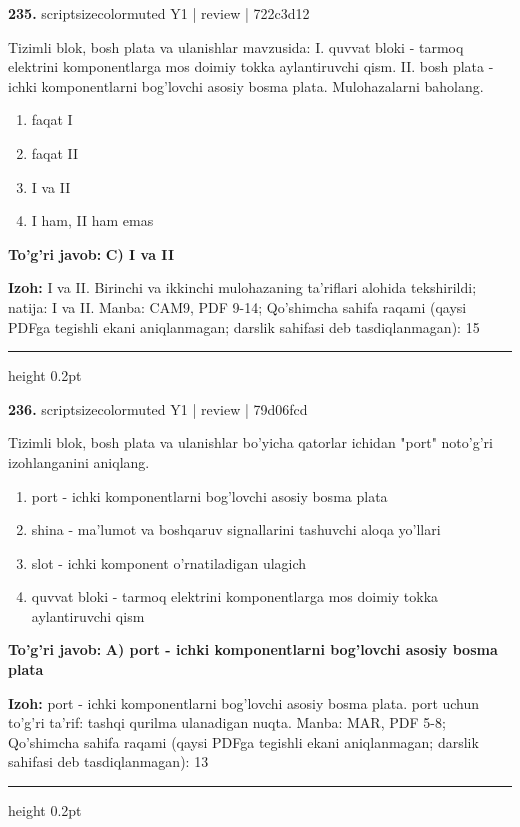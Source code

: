 \documentclass[10pt,a4paper]{article}
\begin{document}
{\bfseries\sffamily\color{ink} 235.} {scriptsizecolor{muted} Y1 | review | 722c3d12}
\par
Tizimli blok, bosh plata va ulanishlar mavzusida: I. quvvat bloki - tarmoq elektrini komponentlarga mos doimiy tokka aylantiruvchi qism. II. bosh plata - ichki komponentlarni bog'lovchi asosiy bosma plata. Mulohazalarni baholang.
\begin{enumerate}[label=\Alph*),leftmargin=9mm]
\item faqat I
\item faqat II
\item I va II
\item I ham, II ham emas
\end{enumerate}
\begin{tcolorbox}[enhanced,breakable,colback=teal!4,colframe=teal!60!black,boxrule=0.45pt,arc=1.2mm,left=2.7mm,right=2.7mm,top=1.8mm,bottom=1.8mm,before skip=2mm,after skip=2mm]
{\bfseries\sffamily\color{teal}To'g'ri javob:} \textbf{C) I va II}
\par\smallskip
{\bfseries Izoh:} I va II. Birinchi va ikkinchi mulohazaning ta'riflari alohida tekshirildi; natija: I va II. Manba: CAM9, PDF 9-14; Qo'shimcha sahifa raqami (qaysi PDFga tegishli ekani aniqlanmagan; darslik sahifasi deb tasdiqlanmagan): 15
\end{tcolorbox}
\vspace{2mm}\hrule height 0.2pt\vspace{3mm}

{\bfseries\sffamily\color{ink} 236.} {scriptsizecolor{muted} Y1 | review | 79d06fcd}
\par
Tizimli blok, bosh plata va ulanishlar bo'yicha qatorlar ichidan "port" noto'g'ri izohlanganini aniqlang.
\begin{enumerate}[label=\Alph*),leftmargin=9mm]
\item port - ichki komponentlarni bog'lovchi asosiy bosma plata
\item shina - ma'lumot va boshqaruv signallarini tashuvchi aloqa yo'llari
\item slot - ichki komponent o'rnatiladigan ulagich
\item quvvat bloki - tarmoq elektrini komponentlarga mos doimiy tokka aylantiruvchi qism
\end{enumerate}
\begin{tcolorbox}[enhanced,breakable,colback=teal!4,colframe=teal!60!black,boxrule=0.45pt,arc=1.2mm,left=2.7mm,right=2.7mm,top=1.8mm,bottom=1.8mm,before skip=2mm,after skip=2mm]
{\bfseries\sffamily\color{teal}To'g'ri javob:} \textbf{A) port - ichki komponentlarni bog'lovchi asosiy bosma plata}
\par\smallskip
{\bfseries Izoh:} port - ichki komponentlarni bog'lovchi asosiy bosma plata. port uchun to'g'ri ta'rif: tashqi qurilma ulanadigan nuqta. Manba: MAR, PDF 5-8; Qo'shimcha sahifa raqami (qaysi PDFga tegishli ekani aniqlanmagan; darslik sahifasi deb tasdiqlanmagan): 13
\end{tcolorbox}
\vspace{2mm}\hrule height 0.2pt\vspace{3mm}
\end{document}
